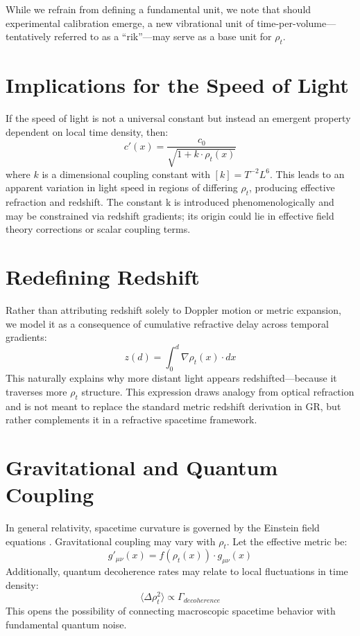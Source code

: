 \documentclass[12pt]{article}
\begin{document}
While we refrain from defining a fundamental unit, we note that should experimental calibration emerge, a new vibrational unit of time-per-volume—tentatively referred to as a “rik”—may serve as a base unit for $\rho_t$.

\section{Implications for the Speed of Light}
If the speed of light is not a universal constant but instead an emergent property dependent on local time density, then:
\[ c'(x) = \frac{c_0}{\sqrt{1 + k \cdot \rho_t(x)}} \]
where $k$ is a dimensional coupling constant with $[k] = T^{-2} L^6$. This leads to an apparent variation in light speed in regions of differing $\rho_t$, producing effective refraction and redshift. The constant k is introduced phenomenologically and may be constrained via redshift gradients; its origin could lie in effective field theory corrections or scalar coupling terms.

\section{Redefining Redshift}
Rather than attributing redshift solely to Doppler motion or metric expansion, we model it as a consequence of cumulative refractive delay across temporal gradients:
\[ z(d) = \int_0^d \nabla \rho_t(x) \cdot dx \]
This naturally explains why more distant light appears redshifted—because it traverses more $\rho_t$ structure. This expression draws analogy from optical refraction and is not meant to replace the standard metric redshift derivation in GR, but rather complements it in a refractive spacetime framework.

\section{Gravitational and Quantum Coupling}
In general relativity, spacetime curvature is governed by the Einstein field equations \cite{einstein1915}.
Gravitational coupling may vary with $\rho_t$. Let the effective metric be:
\[ g'_{\mu\nu}(x) = f(\rho_t(x)) \cdot g_{\mu\nu}(x) \]
Additionally, quantum decoherence rates may relate to local fluctuations in time density:
\[ \langle \Delta \rho_t^2 \rangle \propto \Gamma_{decoherence} \]
This opens the possibility of connecting macroscopic spacetime behavior with fundamental quantum noise.
\end{document}
